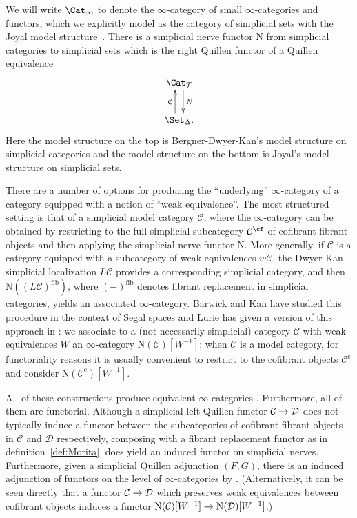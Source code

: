 \documentclass{amsart}
\renewcommand{\to}{\mathchoice{\longrightarrow}{\rightarrow}{\rightarrow}{\rightarrow}}
\let\catsymbfont\mathcal
\newcommand{\aC}{{\catsymbfont{C}}}
\newcommand{\aD}{{\catsymbfont{D}}}
\newcommand{\N}{\mathrm{N}}
\newcommand{\icat}{\Cat_\i}
\newcommand{\Scat}{\Cat_{\mathcal{T}}}%
\renewcommand{\i}{\infty}
\numberwithin{equation}{section}
\theoremstyle{definition}
\begin{document}
We will write $\icat$ to denote the $\i$-category of small
$\i$-categories and functors, which we explicitly model as the
category of simplicial sets with the Joyal model
structure~\cite{Joyal}.  There is a simplicial nerve functor $\N$ from
simplicial categories to simplicial sets which is the right Quillen
functor of a Quillen equivalence~\cite[\S 1.1.5.5, 1.1.5.13,
2.2.5.1]{HTT}
\[
\xymatrix{
\Scat \ar@<1ex>[d]^N \\
 \Set_\Delta \ar@<1ex>[u]^{\mathfrak{C}}.
}
\]
Here the model structure on the top is Bergner-Dwyer-Kan's model
structure on simplicial categories \cite{Bergner} and the model
structure on the bottom is Joyal's model structure on simplicial sets.

There are a number of options for producing the ``underlying''
$\i$-category of a category equipped with a notion of ``weak
equivalence''. The most structured setting is that of a simplicial
model category $\aC$, where the $\i$-category can be obtained by
restricting to the full simplicial subcategory $\aC^{\cf}$ of
cofibrant-fibrant objects and then applying the simplicial nerve functor $\N$.
More generally, if $\aC$ is a category equipped with a subcategory of
weak equivalences $w\aC$, the Dwyer-Kan simplicial localization
$L \aC$ \cite{DwyerKan} provides a corresponding simplicial category,
and then $\N((L\aC)^{\textrm{fib}})$, where $(-)^{\textrm{fib}}$ denotes fibrant 
replacement in simplicial categories, yields an associated
$\i$-category.  Barwick and 
Kan \cite{BarwickKan} have studied this procedure in the context of
Segal spaces and Lurie has given a version of this approach
in \cite[\S 1.3.3]{HAG}: we associate to a (not necessarily
simplicial) category $\aC$ with weak equivalences $W$ an $\i$-category
$\N(\aC)[W^{-1}]$; when $\aC$ is a model category, for functoriality
reasons it is usually convenient to restrict to the cofibrant objects
$\aC^{\mathrm{c}}$ and consider $\N(\aC^{\mathrm{c}})[W^{-1}]$.

All of these constructions produce equivalent
$\i$-categories \cite[1.3.7]{HAG}.  Furthermore, all of them are
functorial.  Although a simplicial left Quillen functor $\aC \to \aD$
does not typically induce a functor between the subcategories of
cofibrant-fibrant objects in $\aC$ and $\aD$ respectively, composing
with a fibrant replacement functor as in definition~\ref{def:Morita},
does yield an induced functor on simplicial nerves.  Furthermore,
given a simplicial Quillen adjunction $(F,G)$, there is an induced
adjunction of functors on the level of $\i$-categories
by \cite[5.2.4.6]{HTT}.  (Alternatively, it can be seen directly that
a functor $\aC \to \aD$ which preserves weak equivalences between
cofibrant objects induces a functor
$\N(\aC)[W^{-1}] \to \N(\aD)[W^{-1}]$.)
\end{document}
